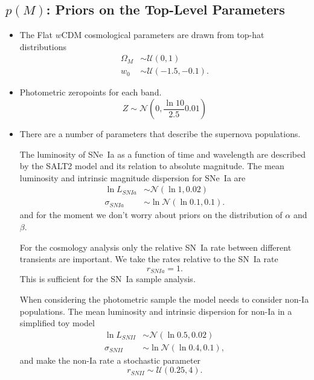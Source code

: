 \documentclass[preprint,3p]{elsarticle}
\begin{document}
\subsection{$p(M)$: Priors on the Top-Level Parameters}
\begin{itemize}
\item
The Flat $w$CDM cosmological parameters are drawn from top-hat distributions
\begin{align}
\Omega_M & \sim  {\mathcal{U}}(0,1)\\
w_0 & \sim \mathcal{U}(-1.5, -0.1).
\end{align}

\item
Photometric zeropoints for each band.
\begin{equation}
Z \sim \mathcal{N}\left(0,\frac{\ln{10}}{2.5}0.01\right)
\end{equation}


\item
There are a number of parameters that describe the supernova populations.

The luminosity of SNe~Ia as a function of time and wavelength are described by the SALT2 model and
its relation to absolute magnitude.
The mean luminosity and intrinsic magnitude dispersion for SNe~Ia are
\begin{align}
\ln{L}_{SNIa} & \sim \mathcal{N}(\ln{1}, 0.02) \\
\sigma_{SNIa} & \sim \ln{\mathcal{N}}(\ln{0.1},0.1).
\end{align}
and for the moment we don't worry about priors on the distribution of $\alpha$ and $\beta$.

For the cosmology analysis only the relative SN~Ia rate between different transients are important.
We take the rates relative to the SN~Ia rate
\begin{equation}
r_{SNIa} = 1.
\end{equation}
This is sufficient for the SN~Ia sample analysis.

When considering the photometric sample the model needs to consider non-Ia populations.
The mean luminosity and intrinsic dispersion for non-Ia in a simplified toy model
\begin{align}
\ln{L}_{SNII} & \sim \mathcal{N}(\ln{0.5}, 0.02) \\
\sigma_{SNII} & \sim \ln{\mathcal{N}}(\ln{0.4},0.1),
\end{align}
and make the non-Ia rate a stochastic parameter
\begin{equation}
r_{SNII} \sim \mathcal{U}(0.25, 4).
\end{equation}

\end{itemize}
\end{document}
